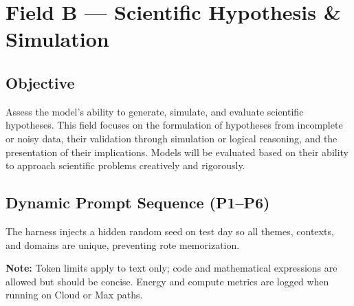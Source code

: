 \section{Field B — Scientific Hypothesis \& Simulation}
\label{sec:fieldB}

\subsection*{Objective}
Assess the model's ability to generate, simulate, and evaluate scientific hypotheses. This field focuses on the formulation of hypotheses from incomplete or noisy data, their validation through simulation or logical reasoning, and the presentation of their implications. Models will be evaluated based on their ability to approach scientific problems creatively and rigorously.

\subsection*{Dynamic Prompt Sequence (P1–P6)}
The harness injects a hidden random seed on test day so all themes, contexts, and domains are unique, preventing rote memorization.

\textbf{Note:} Token limits apply to text only; code and mathematical expressions are allowed but should be concise. Energy and compute metrics are logged when running on Cloud or Max paths.

